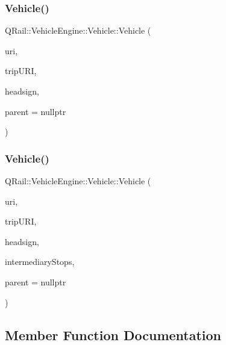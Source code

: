 \subsubsection{\texorpdfstring{Vehicle()}{Vehicle()}\hspace{0.1cm}{\footnotesize\ttfamily [2/3]}}
{\footnotesize\ttfamily Q\+Rail\+::\+Vehicle\+Engine\+::\+Vehicle\+::\+Vehicle (\begin{DoxyParamCaption}\item[{const Q\+Url \&}]{uri,  }\item[{const Q\+Url \&}]{trip\+U\+RI,  }\item[{const Q\+String \&}]{headsign,  }\item[{Q\+Object $\ast$}]{parent = {\ttfamily nullptr} }\end{DoxyParamCaption})\hspace{0.3cm}{\ttfamily [explicit]}}

\mbox{\label{classQRail_1_1VehicleEngine_1_1Vehicle_a58ea75f1cc275d8f800ea449b09cf339}} 
\subsubsection{\texorpdfstring{Vehicle()}{Vehicle()}\hspace{0.1cm}{\footnotesize\ttfamily [3/3]}}
{\footnotesize\ttfamily Q\+Rail\+::\+Vehicle\+Engine\+::\+Vehicle\+::\+Vehicle (\begin{DoxyParamCaption}\item[{const Q\+Url \&}]{uri,  }\item[{const Q\+Url \&}]{trip\+U\+RI,  }\item[{const Q\+String \&}]{headsign,  }\item[{const Q\+List$<$ \mbox{\hyperlink{classQRail_1_1VehicleEngine_1_1Stop}{Q\+Rail\+::\+Vehicle\+Engine\+::\+Stop}} $\ast$ $>$ \&}]{intermediary\+Stops,  }\item[{Q\+Object $\ast$}]{parent = {\ttfamily nullptr} }\end{DoxyParamCaption})\hspace{0.3cm}{\ttfamily [explicit]}}



\subsection{Member Function Documentation}
\mbox{\label{classQRail_1_1VehicleEngine_1_1Vehicle_a43ab0cc2f24db5e77174e6c84a9d7300}} 
